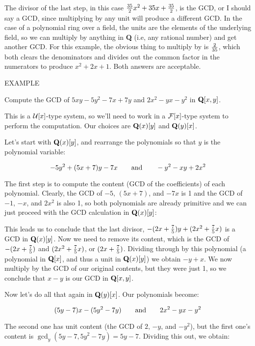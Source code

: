 The divisor of the last step, in this case ${35\over2}x^2+35x+{35\over2}$,
is the GCD, or I should say a GCD, since multiplying by any unit
will produce a different GCD.  In the case of a polynomial ring over
a field, the units are the elements of the underlying field,
so we can multiply by anything in {\bf Q} (i.e, any rational number)
and get another GCD.  For this example, the obvious thing to multiply
by is $2\over35$, which both clears the denominators and divides out
the common factor in the numerators to produce $x^2+2x+1$.  Both
answers are acceptable.

\vfill\eject

EXAMPLE

Compute the GCD of $5xy-5y^2-7x+7y$ and $2x^2-yx-y^2$ in ${\bf Q}[x,y]$.

This is a ${\cal U}[x]$-type system, so we'll need to work in a
${\cal F}[x]$-type system to perform the computation.  Our choices
are ${\bf Q}(x)[y]$ and ${\bf Q}(y)[x]$.

Let's start with ${\bf Q}(x)[y]$, and rearrange the polynomials
so that $y$ is the polynomial variable:

$$-5y^2+(5x+7)y-7x {\rm\qquad and\qquad} -y^2-xy+2x^2$$

The first step is to compute the content (GCD of the coefficients) of
each polynomial.  Clearly, the GCD of $-5$, $(5x+7)$, and $-7x$ is 1
and the GCD of $-1$, $-x$, and $2x^2$ is also 1, so both polynomials
are already primitive and we can just proceed with the GCD calculation
in ${\bf Q}(x)[y]$:



This leads us to conclude that the last divisor,
$-(2x+{7\over5})y+(2x^2+{7\over5}x)$ is a GCD in ${\bf Q}(x)[y]$.  Now
we need to remove its content, which is the GCD of $-(2x+{7\over5})$
and $(2x^2+{7\over5}x)$, or $(2x+{7\over5})$.  Dividing through by
this polynomial (a polynomial in ${\bf Q}[x]$, and thus a unit in
${\bf Q}(x)[y]$) we obtain $-y+x$.  We now multiply by the GCD of our
original contents, but they were just 1, so we conclude that $x-y$
is our GCD in ${\bf Q}[x,y]$.

Now let's do all that again in ${\bf Q}(y)[x]$.  Our polynomials become:

$$(5y-7)x-(5y^2-7y) {\rm\qquad and\qquad} 2x^2-yx-y^2$$

The second one has unit content (the GCD of $2$, $-y$, and $-y^2$),
but the first one's content is $\gcd_y(5y-7,5y^2-7y)=5y-7$.
Dividing this out, we obtain:

